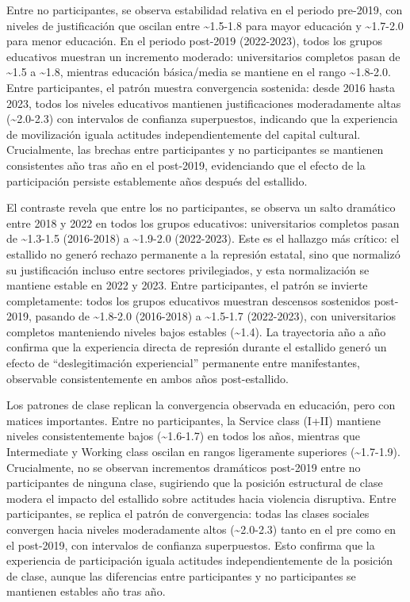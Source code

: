 \documentclass[
  13pt,
]{article}
\begin{document}
Entre no participantes, se observa estabilidad relativa en el periodo
pre-2019, con niveles de justificación que oscilan entre
\textasciitilde1.5-1.8 para mayor educación y \textasciitilde1.7-2.0
para menor educación. En el periodo post-2019 (2022-2023), todos los
grupos educativos muestran un incremento moderado: universitarios
completos pasan de \textasciitilde1.5 a \textasciitilde1.8, mientras
educación básica/media se mantiene en el rango \textasciitilde1.8-2.0.
Entre participantes, el patrón muestra convergencia sostenida: desde
2016 hasta 2023, todos los niveles educativos mantienen justificaciones
moderadamente altas (\textasciitilde2.0-2.3) con intervalos de confianza
superpuestos, indicando que la experiencia de movilización iguala
actitudes independientemente del capital cultural. Crucialmente, las
brechas entre participantes y no participantes se mantienen consistentes
año tras año en el post-2019, evidenciando que el efecto de la
participación persiste establemente años después del estallido.

El contraste revela que entre los no participantes, se observa un salto
dramático entre 2018 y 2022 en todos los grupos educativos:
universitarios completos pasan de \textasciitilde1.3-1.5 (2016-2018) a
\textasciitilde1.9-2.0 (2022-2023). Este es el hallazgo más crítico: el
estallido no generó rechazo permanente a la represión estatal, sino que
normalizó su justificación incluso entre sectores privilegiados, y esta
normalización se mantiene estable en 2022 y 2023. Entre participantes,
el patrón se invierte completamente: todos los grupos educativos
muestran descensos sostenidos post-2019, pasando de
\textasciitilde1.8-2.0 (2016-2018) a \textasciitilde1.5-1.7 (2022-2023),
con universitarios completos manteniendo niveles bajos estables
(\textasciitilde1.4). La trayectoria año a año confirma que la
experiencia directa de represión durante el estallido generó un efecto
de ``deslegitimación experiencial'' permanente entre manifestantes,
observable consistentemente en ambos años post-estallido.

Los patrones de clase replican la convergencia observada en educación,
pero con matices importantes. Entre no participantes, la Service class
(I+II) mantiene niveles consistentemente bajos (\textasciitilde1.6-1.7)
en todos los años, mientras que Intermediate y Working class oscilan en
rangos ligeramente superiores (\textasciitilde1.7-1.9). Crucialmente, no
se observan incrementos dramáticos post-2019 entre no participantes de
ninguna clase, sugiriendo que la posición estructural de clase modera el
impacto del estallido sobre actitudes hacia violencia disruptiva. Entre
participantes, se replica el patrón de convergencia: todas las clases
sociales convergen hacia niveles moderadamente altos
(\textasciitilde2.0-2.3) tanto en el pre como en el post-2019, con
intervalos de confianza superpuestos. Esto confirma que la experiencia
de participación iguala actitudes independientemente de la posición de
clase, aunque las diferencias entre participantes y no participantes se
mantienen estables año tras año.
\end{document}
